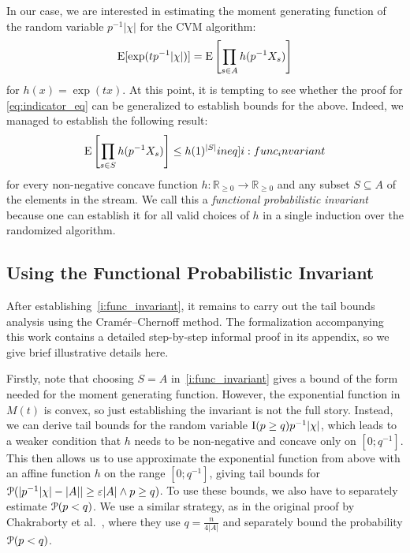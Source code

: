 In our case, we are interested in estimating the moment generating function of the random variable $p^{-1} |\chi|$ for the CVM algorithm:
\[
  \operatorname{\mathrm{E}} [\exp( t p^{-1} |\chi| )] = \operatorname{\mathrm{E}} \left[ \prod_{s \in A} h(p^{-1} X_s) \right]
\]
for $h(x) = \exp(tx)$.
At this point, it is tempting to see whether the proof for \cref{eq:indicator_eq} can be generalized to establish bounds for the above.
Indeed, we managed to establish the following result:
\begin{align}
  \expect \left[ \prod_{s \in S} h(p^{-1} X_s) \right] \leq h(1)^{|S|} \label[ineq]{i:func_invariant}
\end{align}
for every non-negative concave function $h : \mathbb R_{\geq 0} \rightarrow \mathbb R_{\geq 0}$ and any subset $S \subseteq A$ of the elements in the stream.
We call this a \emph{functional probabilistic invariant} because one can establish it for all valid choices of $h$ in a single induction over the randomized algorithm.

\subsection{Using the Functional Probabilistic Invariant}
After establishing~\cref{i:func_invariant}, it remains to carry out the tail bounds analysis using the Cram\'er--Chernoff method.
The formalization accompanying this work contains a detailed step-by-step informal proof in its appendix, so we give brief illustrative details here.

Firstly, note that choosing $S = A$ in~\cref{i:func_invariant} gives a bound of the form needed for the moment generating function.
However, the exponential function in $M(t)$ is convex, so just establishing the invariant is not the full story.
Instead, we can derive tail bounds for the random variable $\operatorname{\mathrm{I}}(p \geq q) p^{-1} |\chi|$, which leads to a weaker condition that $h$ needs to be non-negative and concave only on $[0;q^{-1}]$.
This then allows us to use approximate the exponential function from above with an affine function $h$ on the range $[0;q^{-1}]$, giving tail bounds for $\operatorname{\mathcal P}( |p^{-1} |\chi| - |A|| \geq \varepsilon |A| \wedge p \geq q)$.
To use these bounds, we also have to separately estimate $\operatorname{\mathcal P}(p < q)$.
We use a similar strategy, as in the original proof by Chakraborty et al.~\cite{chakraborty2022}, where they use $q = \frac{n}{4 |A|}$ and separately bound the probability $\operatorname{\mathcal P}(p < q)$.

